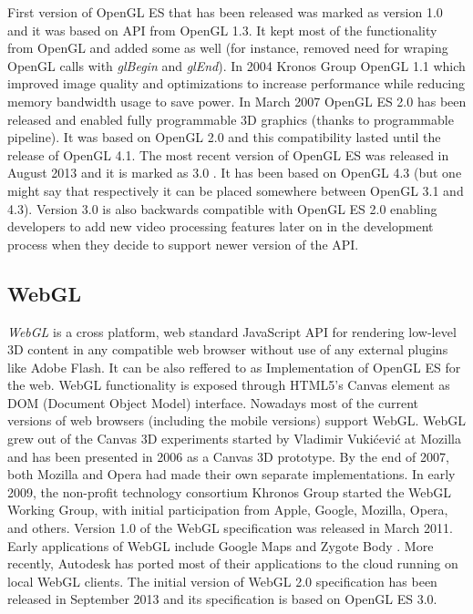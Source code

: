 First version of OpenGL ES that has been released was marked as version 1.0 and it was based on API from OpenGL 1.3.
It kept most of the functionality from OpenGL and added some as well (for instance, removed need for wraping OpenGL calls with \emph{glBegin} and \emph{glEnd}).
\newline In 2004 Kronos Group OpenGL 1.1 which improved image quality and optimizations to increase performance while reducing memory bandwidth usage to save power.
\newline In March 2007 OpenGL ES 2.0 has been released and enabled fully programmable 3D graphics (thanks to programmable pipeline).
It was based on OpenGL 2.0 and this compatibility lasted until the release of OpenGL 4.1.
\newline The most recent version of OpenGL ES was released in August 2013 and it is marked as 3.0 \cite{opengl_es3_spec}.
It has been based on OpenGL 4.3 (but one might say that respectively it can be placed somewhere between OpenGL 3.1 and 4.3).
Version 3.0 is also backwards compatible with OpenGL ES 2.0 enabling developers to add new video processing features later on in the development process when they decide to support newer version of the API.

\subsection{WebGL}
\emph{WebGL} \cite{webgl_kronos} is a cross platform, web standard JavaScript API for rendering low-level 3D content in any compatible web browser without use of any external plugins like Adobe Flash.
It can be also reffered to as Implementation of OpenGL ES for the web.
WebGL functionality is exposed through HTML5's Canvas element as DOM (Document Object Model) interface.
Nowadays most of the current versions of web browsers (including the mobile versions) support WebGL.
WebGL grew out of the Canvas 3D experiments started by Vladimir Vukićević at Mozilla and has been presented in 2006 as a Canvas 3D prototype.
By the end of 2007, both Mozilla and Opera had made their own separate implementations.
In early 2009, the non-profit technology consortium Khronos Group started the WebGL Working Group, with initial participation from Apple, Google, Mozilla, Opera, and others.
Version 1.0 of the WebGL specification was released in March 2011.
Early applications of WebGL include Google Maps and Zygote Body \cite{zygote_body}.
More recently, Autodesk has ported most of their applications to the cloud running on local WebGL clients.
The initial version of WebGL 2.0 specification has been released in September 2013 and its specification is based on OpenGL ES 3.0.

